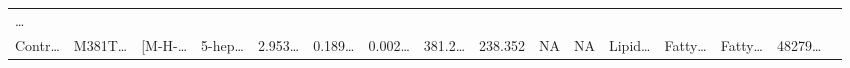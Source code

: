 \documentclass[
]{article}
\begin{document}
\begin{longtable}[]{@{}llllllllllllllll@{}}
\begin{minipage}[t]{0.02\columnwidth}
\ldots{}\strut
\end{minipage}\tabularnewline
\begin{minipage}[t]{0.04\columnwidth}\raggedright
Contr\ldots{}\strut
\end{minipage} & \begin{minipage}[t]{0.04\columnwidth}\raggedright
M381T\ldots{}\strut
\end{minipage} & \begin{minipage}[t]{0.04\columnwidth}\raggedright
{[}M-H-\ldots{}\strut
\end{minipage} & \begin{minipage}[t]{0.04\columnwidth}\raggedright
5-hep\ldots{}\strut
\end{minipage} & \begin{minipage}[t]{0.04\columnwidth}\raggedright
2.953\ldots{}\strut
\end{minipage} & \begin{minipage}[t]{0.04\columnwidth}\raggedright
0.189\ldots{}\strut
\end{minipage} & \begin{minipage}[t]{0.04\columnwidth}\raggedright
0.002\ldots{}\strut
\end{minipage} & \begin{minipage}[t]{0.04\columnwidth}\raggedright
381.2\ldots{}\strut
\end{minipage} & \begin{minipage}[t]{0.04\columnwidth}\raggedright
238.352\strut
\end{minipage} & \begin{minipage}[t]{0.04\columnwidth}\raggedright
NA\strut
\end{minipage} & \begin{minipage}[t]{0.03\columnwidth}\raggedright
NA\strut
\end{minipage} & \begin{minipage}[t]{0.04\columnwidth}\raggedright
Lipid\ldots{}\strut
\end{minipage} & \begin{minipage}[t]{0.04\columnwidth}\raggedright
Fatty\ldots{}\strut
\end{minipage} & \begin{minipage}[t]{0.04\columnwidth}\raggedright
Fatty\ldots{}\strut
\end{minipage} & \begin{minipage}[t]{0.04\columnwidth}\raggedright
48279\ldots{}\strut
\end{minipage} & \begin{minipage}[t]{0.02\columnwidth}\raggedright

\end{minipage}
\end{longtable}
\end{document}
